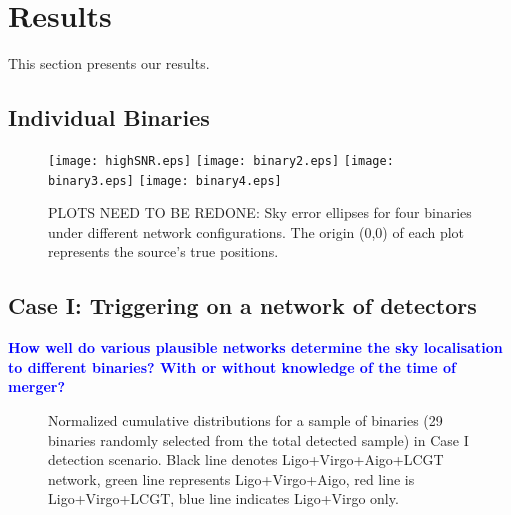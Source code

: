 \documentclass{emulateapj}
\newcommand{\samaya}[1]{\textcolor{blue}{\bf #1}}
\begin{document}
\section{Results}

This section presents our results.  

\subsection{Individual Binaries}



\begin{figure}[t]
\centering 
\texttt{[image: highSNR.eps]}
\texttt{[image: binary2.eps]}
\texttt{[image: binary3.eps]}
\texttt{[image: binary4.eps]}
\caption{PLOTS NEED TO BE REDONE: Sky error
  ellipses for four binaries under different network
  configurations. The origin (0,0) of each plot represents the
  source's true positions.}
\label{fig:highSNRellipse}
\end{figure} 

\subsection{Case I: Triggering on a network of detectors}
\samaya{How well do various plausible networks determine the sky
  localisation to different binaries? With or without knowledge of the
time of merger?}

\begin{figure}[h!]
\centering 
{}
\caption{Normalized cumulative distributions for a sample of
  binaries (29 binaries randomly selected from the total detected
  sample) in Case I detection scenario. Black line denotes
  Ligo+Virgo+Aigo+LCGT network, green line represents Ligo+Virgo+Aigo,
  red line is Ligo+Virgo+LCGT, blue line indicates Ligo+Virgo only.  
}
\label{fig:Normcd}
\end{figure} 
\end{document}
